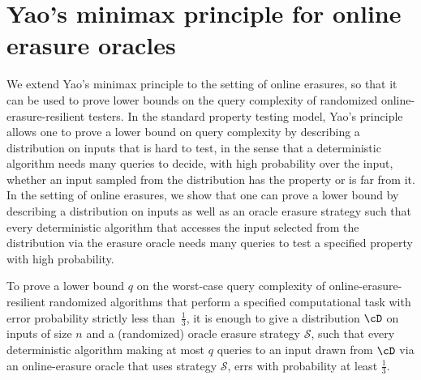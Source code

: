 \documentclass{toc}
\begin{document}
	

	
	
%
\section{Yao's minimax principle for online erasure oracles}\label{sec:yao}
	
	We extend Yao's minimax principle \cite{Yao77} to the setting of online erasures, so that it can be used  to prove lower bounds on the query complexity of randomized online-erasure-resilient testers. In the standard property testing model, Yao's principle allows one to prove a lower bound on query complexity by describing a distribution on inputs that is hard to test, in the sense that a deterministic algorithm needs many queries to decide, with high probability over the input, whether an input sampled from the distribution has the property or is far from it. In the setting of online erasures, we show that one can prove a lower bound by describing a distribution on inputs as well as an oracle erasure strategy such that every deterministic algorithm that accesses the input selected from the distribution via the erasure oracle needs many queries to test a specified property with high  probability. 
	
	\begin{theorem}
		\label{thm:yao}
		To prove a lower bound $q$ on the worst-case query complexity of online-erasure-resilient randomized algorithms that perform a specified computational task with error probability strictly less than~$\frac{1}{3}$, it is enough to give a distribution $\cD$ on inputs of size $n$ and a (randomized) oracle erasure strategy $\mathcal{S}$, such that every deterministic algorithm making at most $q$ queries to an input drawn from $\cD$ via an online-erasure oracle that uses strategy $\mathcal{S}$, errs with probability at least $\frac{1}{3}$.
	\end{theorem}

%
	
\end{document}
